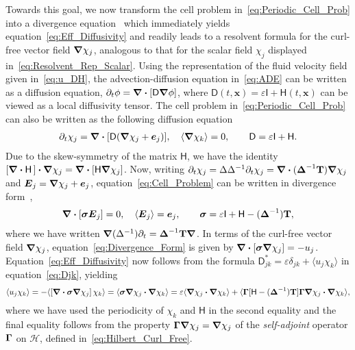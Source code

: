 \documentclass[leqno,onefignum,onetabnum]{siamltex1213}
\newcommand{\Tb}{\mathbf{T}}
\newcommand{\Hc}{\mathcal{H}}
\newcommand{\Dm}{\mathsf{D}}
\newcommand{\Hm}{\mathsf{H}}
\newcommand{\Ib}{\mathsf{I}}
\newcommand\bsig{\mbox{\boldmath${\sigma}$}}
\newcommand\bDelta{\mbox{\boldmath${\Delta}$}}
\newcommand\bGamma{\mbox{\boldmath${\Gamma}$}}
\newcommand\bnabla{\mbox{\boldmath${\nabla}$}}
\providecommand\bcdot{\boldsymbol{\cdot}}
\newcommand{\vecE}{\boldsymbol{E}}
\newcommand{\vecx}{\boldsymbol{x}}
\newcommand{\vece}{\boldsymbol{e}}
\begin{document}
Towards this goal, we now transform the cell problem
in~\eqref{eq:Periodic_Cell_Prob} into a divergence
equation~\cite{Fannjiang:1994:SIAM_JAM:333} which immediately yields
equation~\eqref{eq:Eff_Diffusivity} and readily leads to a resolvent
formula for the curl-free vector field $\bnabla\chi_j$, analogous to that
for the scalar field $\chi_j$ displayed in~\eqref{eq:Resolvent_Rep_Scalar}. Using the
representation of the fluid velocity field given in~\eqref{eq:u_DH}, the
advection-diffusion equation in~\eqref{eq:ADE} can be written as a
diffusion equation, $\partial_t\phi=\bnabla \bcdot[\Dm\bnabla\phi]$, where
$\Dm(t,\vecx)=\varepsilon\Ib+\Hm(t,\vecx)$ can be viewed as a local diffusivity
tensor. The cell problem in~\eqref{eq:Periodic_Cell_Prob} can also be
written as the following diffusion
equation~\cite{Fannjiang:1994:SIAM_JAM:333}     
% 
\begin{align}\label{eq:Cell_Problem}
  \partial_t\chi_j=\bnabla \bcdot[\Dm(\bnabla \chi_j+\vece_j)],
  \quad
  \langle\bnabla \chi_k\rangle=0, \qquad
  \Dm=\varepsilon\Ib+\Hm.
\end{align}
%
Due to the skew-symmetry of the matrix $\Hm$, we have the identity
$[\bnabla\bcdot\Hm\,]\bcdot\bnabla\chi_j=\bnabla\bcdot[\Hm\bnabla\chi_j]$.
Now, writing $\partial_t\chi_j=\Delta\Delta^{-1}\partial_t\chi_j=\bnabla\bcdot(\bDelta^{-1}\Tb)\bnabla\chi_j$ and
$\vecE_j=\bnabla\chi_j+\vece_j$, equation~\eqref{eq:Cell_Problem} can be
written in divergence form~\cite{Fannjiang:1994:SIAM_JAM:333},   
%
\begin{align}\label{eq:Divergence_Form}
  \bnabla\bcdot[\bsig\vecE_j]=0,
  \quad
  \langle\vecE_j\rangle=\vece_j,
  \qquad
  \bsig=\varepsilon\Ib+\Hm-(\bDelta^{-1})\Tb,
\end{align}
%
where we have written
$\bnabla(\Delta^{-1})\partial_t=\bDelta^{-1}\Tb\bnabla$. In terms of the curl-free
vector field $\bnabla\chi_j$, equation~\eqref{eq:Divergence_Form} is
given by
$\bnabla\bcdot[\bsig\bnabla\chi_j]=-u_j$. Equation~\eqref{eq:Eff_Diffusivity} 
now follows from the formula $\Dm^*_{jk}=\varepsilon\delta_{jk}+\langle u_j\chi_k\rangle$ in
equation~\eqref{eq:Djk}, yielding
%
\begin{align}\label{eq:Functional_Rep}
  \langle u_j\chi_k\rangle=-\langle[\bnabla\bcdot\bsig\bnabla\chi_j]\,\chi_k\rangle
       =\langle\bsig\bnabla\chi_j\bcdot\bnabla\chi_k\rangle      
       =\varepsilon\langle\bnabla\chi_j\bcdot\bnabla\chi_k\rangle
         +\langle\bGamma[\Hm-(\bDelta^{-1})\Tb]\bGamma\bnabla\chi_j\bcdot\bnabla\chi_k\rangle,       
\end{align}
%
where we have used the periodicity of $\chi_k$ and $\Hm$ in the second
equality and the final equality follows from the property
$\bGamma\bnabla\chi_j=\bnabla\chi_j$ of the \emph{self-adjoint} operator $\bGamma$ on
$\Hc$, defined in~\eqref{eq:Hilbert_Curl_Free}.
\end{document}
